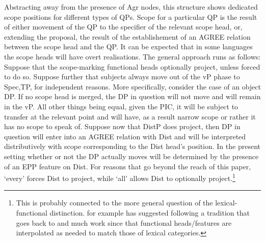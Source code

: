 \documentclass{glossa}
\begin{document}
Abstracting away from the presence of Agr nodes, this structure shows dedicated scope positions for different types of QPs.  Scope for a particular QP is the result of either movement of the QP to the specifier of the relevant scope head, or, extending the proposal, the result of the establishement of an AGREE relation between the scope head and the QP.  It can be expected that in some languages the scope heads will have overt realisations.  The general approach runs as follows:  Suppose that the scope-marking functional heads optionally project, unless forced to do so.  Suppose further that subjects always move out of the vP phase to Spec,TP, for independent reasons.
More specifically, consider the case of an object DP.  If no scope head is merged, the DP in question will not move and will remain in the vP.   All other things being equal, given the  PIC, it will be subject to transfer at the relevant point and will have, as a result narrow scope or rather it has no scope to speak of. Suppose now that DistP does project, then DP in question will enter into an AGREE relation with Dist and will be  interpreted distributively with scope corresponding to the Dist head's position.  In the present setting whether or not the DP actually moves will be determined by the presence of an EPP feature on Dist.
For reasons that go beyond the reach of this paper, `every' forces Dist to project, while `all' allows Dist to optionally project.\footnote{This is probably connected to the more general question of the lexical-functional distinction. \cite{hegarty:93,hegarty:05} for example has suggested following a tradition that goes back to \citet{abney:87} and much work since that functional heads/features are interpolated  as needed to match those of lexical categories.}
  
\end{document}
